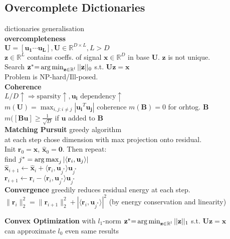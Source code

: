 \subsection*{Overcomplete Dictionaries}
dictionaries generalisation\\
\textbf{overcompleteness}\\
$\mathbf{U}{=}[\mathbf{u_1}\dotsi\mathbf{u_L}], \mathbf{U}\in\mathbb{R}^{D\times L}, L>D$\\
$\mathbf{z}\in\mathbb{R}^L$ contains coeffs. of signal $\mathbf{x}\in\mathbb{R}^D$ in base $\mathbf{U}$. $\mathbf{z}$ is not unique.\\ Search $\mathbf{z}^*{=}\operatorname*{arg\,min}_{\mathbf{z}\in\mathbb{R}^l}||\mathbf{z}||_0$ s.t. $\mathbf{U}\mathbf{z}{=}\mathbf{x}$\\
Problem is NP-hard/Ill-posed.\\
\textbf{Coherence}\\
$L/D \uparrow \Rightarrow \text{sparsity}\uparrow, \mathbf{u_i}\text{ dependency} \uparrow$\\
$m(\mathbf{U})=\max_{i,j:i\neq j}|\mathbf{u_i}^T\mathbf{u_j}|$ coherence
$m(\mathbf{B})=0$ for orhtog. $\mathbf{B}$\\
$m([\mathbf{Bu}]\geq\frac{1}{\sqrt{D}}$ if $\mathbf{u}$ added to $\mathbf{B}$\\
\textbf{Matching Pursuit} greedy algorithm\\
at each step chose dimension with max projection onto residual.\\
Init $\mathbf{r}_0=\mathbf{x}$, $\hat{\mathbf{x}}_0=\mathbf{0}$. Then repeat:\\
find $j^*=\operatorname*{arg\,max}_j|\langle\mathbf{r}_i, \mathbf{u}_j\rangle|$\\
$\hat{\mathbf{x}}_{i+1}\leftarrow\hat{\mathbf{x}}_i+\langle\mathbf{r}_i,\mathbf{u}_{j^*}\rangle\mathbf{u}_{j^*}$\\
$\mathbf{r}_{i+1}\leftarrow\mathbf{r}_i-\langle\mathbf{r}_i,\mathbf{u}_{j^*}\rangle\mathbf{u}_{j^*}$\\
\textbf{Convergence} greedily reduces residual energy at each step.\\
$\|\mathbf{r}_i\|_2^2=\|\mathbf{r}_{i+1}\|_2^2+|\langle\mathbf{r}_i,\mathbf{u}_{j^*}\rangle|^2$ (by energy conservation and linearity)

\textbf{Convex Optimization} with $l_1$-norm
$\mathbf{z}^*{=}\operatorname*{arg\,min}_{\mathbf{z}\in\mathbb{R}^l}||\mathbf{z}||_1$ s.t. $\mathbf{U}\mathbf{z}{=}\mathbf{x}$\\
can approximate $l_0$ even same results
